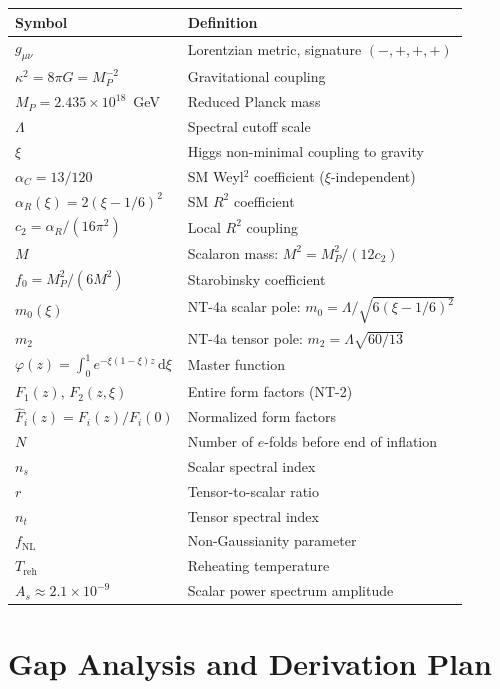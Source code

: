 \documentclass[11pt,a4paper]{article}
\renewcommand{\dd}{\mathrm{d}}
\newcommand{\Fhat}{\hat{F}}
\theoremstyle{plain}
\theoremstyle{definition}
\begin{document}
\begin{center}
\renewcommand{\arraystretch}{1.3}
\begin{longtable}{ll}
\toprule
Symbol & Definition \\
\midrule
$g_{\mu\nu}$ & Lorentzian metric, signature $(-,+,+,+)$ \\
$\kappa^2 = 8\pi G = M_P^{-2}$ & Gravitational coupling \\
$M_P = 2.435 \times 10^{18}$~GeV & Reduced Planck mass \\
$\Lambda$ & Spectral cutoff scale \\
$\xi$ & Higgs non-minimal coupling to gravity \\
$\alpha_C = 13/120$ & SM Weyl$^2$ coefficient ($\xi$-independent) \\
$\alpha_R(\xi) = 2(\xi - 1/6)^2$ & SM $R^2$ coefficient \\
$c_2 = \alpha_R/(16\pi^2)$ & Local $R^2$ coupling \\
$M$ & Scalaron mass: $M^2 = M_P^2/(12c_2)$ \\
$f_0 = M_P^2/(6M^2)$ & Starobinsky coefficient \\
$m_0(\xi)$ & NT-4a scalar pole: $m_0 = \Lambda/\sqrt{6(\xi-1/6)^2}$ \\
$m_2$ & NT-4a tensor pole: $m_2 = \Lambda\sqrt{60/13}$ \\
$\varphi(z) = \int_0^1 e^{-\xi(1-\xi)z}\,\dd\xi$ & Master function \\
$F_1(z)$, $F_2(z,\xi)$ & Entire form factors (NT-2) \\
$\Fhat_i(z) = F_i(z)/F_i(0)$ & Normalized form factors \\
$N$ & Number of $e$-folds before end of inflation \\
$n_s$ & Scalar spectral index \\
$r$ & Tensor-to-scalar ratio \\
$n_t$ & Tensor spectral index \\
$f_{\mathrm{NL}}$ & Non-Gaussianity parameter \\
$T_{\mathrm{reh}}$ & Reheating temperature \\
$A_s \approx 2.1 \times 10^{-9}$ & Scalar power spectrum amplitude \\
\bottomrule
\end{longtable}
\end{center}

\section{Gap Analysis and Derivation Plan}\label{sec:gaps}
\end{document}
